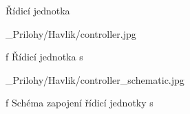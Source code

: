 \app Řídicí jednotka

\medskip {}
\picw=10cm _Prilohy/Havlik/controller.jpg
\caption/f Řídicí jednotka s 
\medskip

\medskip {}
\picw=15cm _Prilohy/Havlik/controller_schematic.jpg
\caption/f Schéma zapojení řídicí jednotky s 
\medskip

\par